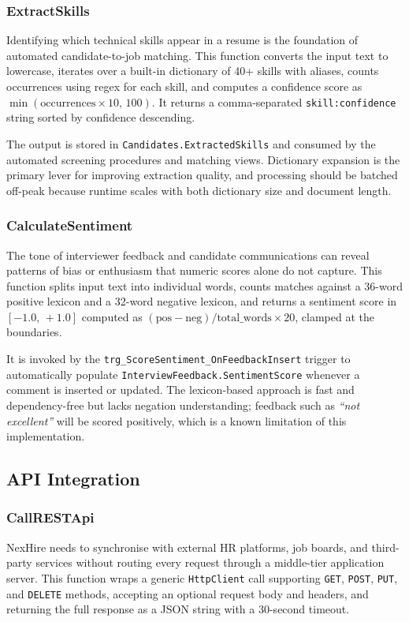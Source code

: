 \documentclass[11pt,a4paper]{article}
\begin{document}
\subsubsection{ExtractSkills}
\noindent
Identifying which technical skills appear in a resume is the foundation of automated candidate-to-job matching. This function converts the input text to lowercase, iterates over a built-in dictionary of 40+ skills with aliases, counts occurrences using regex for each skill, and computes a confidence score as $\min(\text{occurrences} \times 10,\, 100)$. It returns a comma-separated \texttt{skill:confidence} string sorted by confidence descending.

The output is stored in \texttt{Candidates.ExtractedSkills} and consumed by the automated screening procedures and matching views. Dictionary expansion is the primary lever for improving extraction quality, and processing should be batched off-peak because runtime scales with both dictionary size and document length.

\subsubsection{CalculateSentiment}
\noindent
The tone of interviewer feedback and candidate communications can reveal patterns of bias or enthusiasm that numeric scores alone do not capture. This function splits input text into individual words, counts matches against a 36-word positive lexicon and a 32-word negative lexicon, and returns a sentiment score in $[-1.0,\,+1.0]$ computed as $(\text{pos} - \text{neg}) / \text{total\_words} \times 20$, clamped at the boundaries.

It is invoked by the \texttt{trg\_ScoreSentiment\_OnFeedbackInsert} trigger to automatically populate \texttt{InterviewFeedback.SentimentScore} whenever a comment is inserted or updated. The lexicon-based approach is fast and dependency-free but lacks negation understanding; feedback such as \textit{``not excellent''} will be scored positively, which is a known limitation of this implementation.

\subsection{API Integration}

\subsubsection{CallRESTApi}
\noindent
NexHire needs to synchronise with external HR platforms, job boards, and third-party services without routing every request through a middle-tier application server. This function wraps a generic \texttt{HttpClient} call supporting \texttt{GET}, \texttt{POST}, \texttt{PUT}, and \texttt{DELETE} methods, accepting an optional request body and headers, and returning the full response as a JSON string with a 30-second timeout.
\end{document}
